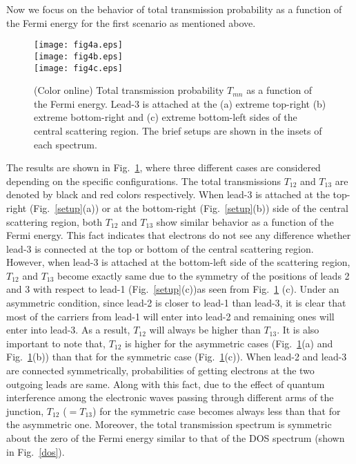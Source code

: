 \documentclass[prb,aps,twocolumn,amsmath,amssymb,floatfix,
superscriptaddress]{revtex4}
\begin{document}
Now we focus on the behavior of total transmission probability
as a function of the Fermi energy for the first scenario as mentioned
above.
\begin{figure}[h]
\centering
\texttt{[image: fig4a.eps]}\\
\texttt{[image: fig4b.eps]}\\
\texttt{[image: fig4c.eps]}\\
\caption{(Color online) Total transmission probability $T_{mn}$ as a
  function of the Fermi energy. Lead-3 is attached at the (a) extreme
  top-right (b) extreme bottom-right and (c) extreme bottom-left sides
  of the central scattering region. The brief setups are shown in the
  insets of each spectrum.}
\label{t-asym}
\end{figure}
The results are shown in Fig.~\ref{t-asym}, where three different
cases are considered depending on the specific configurations. The
total transmissions $T_{12}$ and $T_{13}$ are denoted by black and red
colors respectively. When lead-3 is attached at the top-right
(Fig.~\ref{setup}(a)) or at the bottom-right (Fig.~\ref{setup}(b))
side of the central scattering region, both $T_{12}$ and $T_{13}$ show
similar behavior as a function of the Fermi energy. This fact
indicates that electrons do not see any difference whether lead-3 is
connected at the top or bottom of the central scattering
region. However, when lead-3 is attached at the bottom-left side of
the scattering region, $T_{12}$ and $T_{13}$ become exactly same due
to the symmetry of the positions of leads 2 and 3 with respect to
lead-1 (Fig.~\ref{setup}(c))as seen from Fig.~\ref{t-asym} (c). Under
an asymmetric condition, since lead-2 is closer to lead-1 than lead-3,
it is clear that most of the carriers from lead-1 will enter into
lead-2 and remaining ones will enter into lead-3. As a result,
$T_{12}$ will always be higher than $T_{13}$. It is also important to
note that, $T_{12}$ is higher for the asymmetric cases
(Fig.~\ref{t-asym}(a) and Fig.~\ref{t-asym}(b)) than that for the
symmetric case (Fig.~\ref{t-asym}(c)). When lead-2 and lead-3 are
connected symmetrically, probabilities of getting electrons at the two
outgoing leads are same. Along with this fact, due to the effect of
quantum interference among the electronic waves passing through
different arms of the junction, $T_{12}$ ($=T_{13}$) for the symmetric
case becomes always less than that for the asymmetric one. Moreover,
the total transmission spectrum is symmetric about the zero of the
Fermi energy similar to that of the DOS spectrum (shown in Fig.~{\ref{dos}}).
\end{document}
